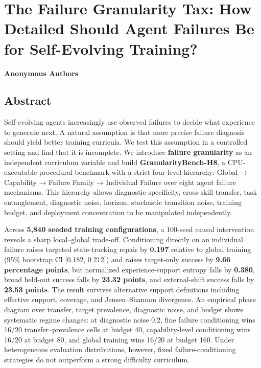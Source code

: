 \documentclass[
]{article}
\author{}
\date{}
\begin{document}
{
\setcounter{tocdepth}{3}
\tableofcontents
}
\section{The Failure Granularity Tax: How Detailed Should Agent Failures
Be for Self-Evolving
Training?}\label{the-failure-granularity-tax-how-detailed-should-agent-failures-be-for-self-evolving-training}

\textbf{Anonymous Authors}

\subsection{Abstract}\label{abstract}

Self-evolving agents increasingly use observed failures to decide what
experience to generate next. A natural assumption is that more precise
failure diagnosis should yield better training curricula. We test this
assumption in a controlled setting and find that it is incomplete. We
introduce \textbf{failure granularity} as an independent curriculum
variable and build \textbf{GranularityBench-H8}, a CPU-executable
procedural benchmark with a strict four-level hierarchy: Global →
Capability → Failure Family → Individual Failure over eight agent
failure mechanisms. This hierarchy allows diagnostic specificity,
cross-skill transfer, task entanglement, diagnostic noise, horizon,
stochastic transition noise, training budget, and deployment
concentration to be manipulated independently.

Across \textbf{5,840 seeded training configurations}, a 100-seed causal
intervention reveals a sharp local--global trade-off. Conditioning
directly on an individual failure raises targeted state-tracking repair
by \textbf{0.197} relative to global training (95\% bootstrap CI
{[}0.182, 0.212{]}) and raises target-only success by \textbf{9.66
percentage points}, but normalized experience-support entropy falls by
\textbf{0.380}, broad held-out success falls by \textbf{23.32 points},
and external-shift success falls by \textbf{23.53 points}. The result
survives alternative support definitions including effective support,
coverage, and Jensen--Shannon divergence. An empirical phase diagram
over transfer, target prevalence, diagnostic noise, and budget shows
systematic regime changes: at diagnostic noise 0.2, fine failure
conditioning wins 16/20 transfer--prevalence cells at budget 40,
capability-level conditioning wins 16/20 at budget 80, and global
training wins 16/20 at budget 160. Under heterogeneous evaluation
distributions, however, fixed failure-conditioning strategies do not
outperform a strong difficulty curriculum.
\end{document}
